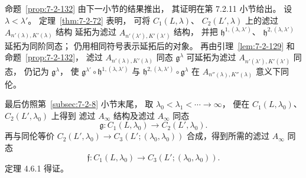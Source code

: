 命题~\ref{prop:7-2-132}
由下一小节的结果推出，
其证明在第 7.2.11 小节给出。
设 $\lambda<\lambda'$。
定理~\ref{thm:7-2-72} 表明，
可将 $C_1(L,\lambda)$、
$C_2(L',\lambda)$ 上的滤过
$A_{n'(\lambda),K'(\lambda)}$ 结构
延拓为滤过
$A_{n'(\lambda'),K'(\lambda')}$ 结构，
并把
$\mathfrak h^{1,(\lambda,\lambda')}$、
$\mathfrak h^{2,(\lambda,\lambda')}$
延拓为同阶同态；
仍用相同符号表示延拓后的对象。
再由引理~\ref{lem:7-2-129}
和命题~\ref{prop:7-2-132}，
滤过 $A_{n'(\lambda),K'(\lambda)}$
同态 $\mathfrak g^\lambda$
可延拓为滤过
$A_{n'(\lambda'),K'(\lambda')}$ 同态，
仍记为 $\mathfrak g^\lambda$，
使
$\mathfrak g^{\lambda'}\circ
\mathfrak h^{1,(\lambda,\lambda')}$
与
$\mathfrak h^{2,(\lambda,\lambda')}\circ
\mathfrak g^\lambda$
在 $A_{n''(\lambda),K''(\lambda)}$
意义下同伦。

最后仿照第~\ref{subsec:7-2-8} 小节末尾，
取 $\lambda_0<\lambda_1<\cdots\to\infty$，
便在 $C_1(L,\lambda_0)$、
$C_2(L',\lambda_0)$ 上得到
滤过 $A_\infty$ 结构及滤过 $A_\infty$ 同态
\[
\mathfrak g\colon
C_1(L,\lambda_0)\to C_2(L',\lambda_0).
\]
再与同伦等价
$C_2(L',\lambda_0)
\to C_3(L';(\lambda_0,\lambda_0))$
合成，得到所需的滤过 $A_\infty$ 同态
\[
\mathfrak f\colon C_1(L,\lambda_0)
\longrightarrow C_3(L';(\lambda_0,\lambda_0)).
\]
定理 4.6.1 得证。
